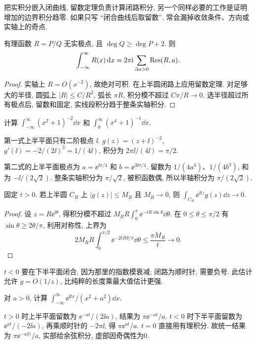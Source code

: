 把实积分嵌入闭曲线, 留数定理负责计算闭路积分, 另一个同样必要的工作是证明增加的边界积分趋零. 如果只写 ``闭合曲线后取留数'', 常会漏掉收敛条件、方向或实轴上的奇点.
\begin{proposition}
有理函数 $R=P/Q$ 无实极点, 且 $\deg Q\ge\deg P+2$. 则
\[
\int_{-\infty}^\infty R(x)\,\mathrm d x=2\pi\mathrm i\sum_{\Im a>0}\operatorname{Res}(R,a).
\]
\end{proposition}
\begin{proof}
实轴上 $R=O(x^{-2})$, 故绝对可积. 在上半圆闭路上应用留数定理. 对足够大的半径, 圆弧上 $|R|\le C/R^2$, 弧长 $\pi R$, 积分模不超过 $C\pi/R\to0$. 选半径超过所有极点后, 留数和固定, 实线段积分趋于整条实轴积分.
\end{proof}
\begin{example}
计算 $\int_{-\infty}^{\infty}(x^2+1)^{-2}\dd x$ 和 $\int_0^\infty (x^4+1)^{-1}\dd x$.
\end{example}
\begin{solution}
第一式上半平面只有二阶极点 $\ii$. $g(z)=(z+\ii)^{-2}$, $g'(\ii)=-2/(2\ii)^3=1/(4\ii)$, 积分为 $2\pi\ii/(4\ii)=\pi/2$.

第二式的上半平面极点为 $a=\ee^{\ii\pi/4}$ 和 $b=\ee^{3\ii\pi/4}$. 留数为 $1/(4a^3)$、$1/(4b^3)$, 和为 $-\ii/(2\sqrt2)$. 整条实轴积分为 $\pi/\sqrt2$, 被积函数偶, 所以半轴积分为 $\pi/(2\sqrt2)$.
\end{solution}

\begin{lemma}[Jordan 估计]\label{lem:jordan}
固定 $t>0$. 若上半圆 $C_R$ 上 $|g(z)|\le M_R$ 且 $M_R\to0$, 则 $\int_{C_R}\ee^{\ii tz}g(z)\dd z\to0$.
\end{lemma}
\begin{proof}
设 $z=R\ee^{\ii\theta}$, 得积分模不超过 $M_RR\int_0^\pi\ee^{-tR\sin\theta}\dd\theta$. 在 $0\le\theta\le\pi/2$ 有 $\sin\theta\ge2\theta/\pi$, 利用对称性, 上界为
\[
2M_RR\int_0^{\pi/2}\ee^{-2tR\theta/\pi}\dd\theta
\le\frac{\pi M_R}{t}\longrightarrow0.
\]
\end{proof}
$t<0$ 要在下半平面闭合, 因为那里的指数模衰减; 闭路为顺时针, 需要负号. 此估计允许 $g=O(1/z)$, 比纯粹的长度乘最大值估计更强.
\begin{example}
对 $a>0$, 计算 $\int_{-\infty}^\infty\ee^{\ii tx}/(x^2+a^2)\dd x$.
\end{example}
\begin{solution}
$t>0$ 时上半平面留数为 $\ee^{-at}/(2\ii a)$, 结果为 $\pi\ee^{-at}/a$. $t<0$ 时下半平面留数为 $\ee^{at}/(-2\ii a)$, 再乘顺时针的 $-2\pi\ii$, 得 $\pi\ee^{at}/a$. $t=0$ 直接用有理积分. 故统一结果为 $\pi\ee^{-a|t|}/a$, 实部给余弦积分, 虚部因奇偶性为0.
\end{solution}

